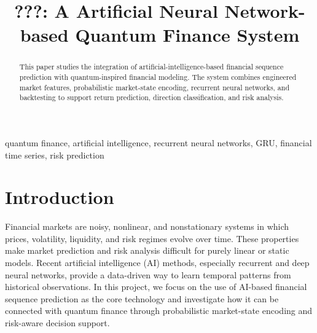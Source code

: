 \documentclass[conference]{IEEEtran}
\begin{document}
\title{???: A Artificial Neural Network-based Quantum Finance System}

\author{
\and
{}
\and
{}
}

\maketitle

\begin{abstract}
This paper studies the integration of artificial-intelligence-based financial sequence prediction with quantum-inspired financial modeling. The system combines engineered market features, probabilistic market-state encoding, recurrent neural networks, and backtesting to support return prediction, direction classification, and risk analysis.
\end{abstract}

\begin{IEEEkeywords}
quantum finance, artificial intelligence, recurrent neural networks, GRU, financial time series, risk prediction
\end{IEEEkeywords}

\section{Introduction}
Financial markets are noisy, nonlinear, and nonstationary systems in which prices, volatility, liquidity, and risk regimes evolve over time. These properties make market prediction and risk analysis difficult for purely linear or static models. Recent artificial intelligence (AI) methods, especially recurrent and deep neural networks, provide a data-driven way to learn temporal patterns from historical observations. In this project, we focus on the use of AI-based financial sequence prediction as the core technology and investigate how it can be connected with quantum finance through probabilistic market-state encoding and risk-aware decision support.
\end{document}
